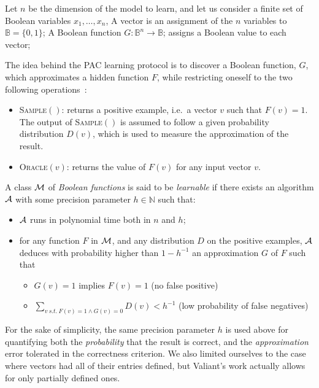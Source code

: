 \documentclass{llncs}
\begin{document}
Let $n$ be the dimension of the model to learn, and let us consider a finite set of Boolean variables $x_1,\ldots,x_n$,
 A vector is an assignment of the $n$ variables to  $\mathbb{B} = \{0,1\}$;
 A Boolean function $G:{\mathbb{B}}^n \rightarrow \mathbb{B}$;
	assigns a Boolean value to each vector;


The idea behind the PAC learning protocol is to discover a Boolean function, $G$, which approximates a hidden function $F$, while restricting oneself to the two following operations~:
\begin{itemize}
  \item
\textsc{Sample}$()$: returns a positive example, i.e.~a vector $v$ such that $F(v)=1$.
The output of \textsc{Sample}$()$ is assumed to follow a given probability distribution $D(v)$, which is used to measure the approximation of the result.
  \item
\textsc{Oracle}$(v)$: returns the value of $F(v)$ for any input vector $v$.
\end{itemize}


\begin{definition}\label{def:learnclass}
   A class $\cal M$ of \emph{Boolean functions} is said to be \emph{learnable}
   if there exists an algorithm $\cal A$ with some precision parameter $h\in\mathbb N$ such that:
   \begin{itemize}
      \item $\cal A$ runs in polynomial time both in $n$ and $h$;
      \item
         for any function $F$ in $\cal M$, and any distribution $D$ on the positive examples,
         $\cal A$ deduces with probability higher than $1-h^{-1}$ an approximation $G$ of $F$ such that
         \begin{itemize}
            \item $G(v)=1$ implies $F(v)=1$ (no false positive)
            \item
               $\displaystyle\sum_{v\ s.t.\ F(v)=1\wedge G(v)=0} D(v) < h^{-1}$ (low probability of false negatives)
         \end{itemize}
   \end{itemize}
\end{definition}

For the sake of simplicity, the same precision parameter $h$ is used above for quantifying both the \emph{probability} that the result is correct,
and the \emph{approximation} error tolerated in the correctness criterion.
We also limited ourselves to the case where vectors had all of their entries defined, but Valiant's work actually allows for only partially defined ones.
\end{document}
